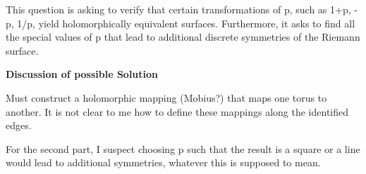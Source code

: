 \documentclass[]{article}
\begin{document}
This question is asking to verify that certain transformations of p, such as 1+p, -p, 1/p, yield holomorphically equivalent surfaces. Furthermore, it asks to find all the special values of p that lead to additional discrete symmetries of the Riemann surface.

\textbf{Discussion of possible Solution}

Must construct a holomorphic mapping (Mobius?) that maps one torus to another. It is not clear to me how to define these mappings along the identified edges. 

For the second part, I suspect choosing p such that the result is a square or a line would lead to additional symmetries, whatever this is supposed to mean.
\end{document}
